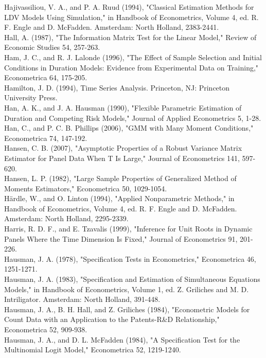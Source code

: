 \documentclass[10pt]{article}
\begin{document}
Hajivassiliou, V. A., and P. A. Ruud (1994), "Classical Estimation Methods for LDV Models Using Simulation," in Handbook of Econometrics, Volume 4, ed. R. F. Engle and D. McFadden. Amsterdam: North Holland, 2383-2441.\\
Hall, A. (1987), "The Information Matrix Test for the Linear Model," Review of Economic Studies 54, 257-263.\\
Ham, J. C., and R. J. Lalonde (1996), "The Effect of Sample Selection and Initial Conditions in Duration Models: Evidence from Experimental Data on Training," Econometrica 64, 175-205.\\
Hamilton, J. D. (1994), Time Series Analysis. Princeton, NJ: Princeton University Press.\\
Han, A. K., and J. A. Hausman (1990), "Flexible Parametric Estimation of Duration and Competing Risk Models," Journal of Applied Econometrics 5, 1-28.\\
Han, C., and P. C. B. Phillips (2006), "GMM with Many Moment Conditions," Econometrica 74, 147-192.\\
Hansen, C. B. (2007), "Asymptotic Properties of a Robust Variance Matrix Estimator for Panel Data When T Is Large," Journal of Econometrics 141, 597-620.\\
Hansen, L. P. (1982), "Large Sample Properties of Generalized Method of Moments Estimators," Econometrica 50, 1029-1054.\\
Härdle, W., and O. Linton (1994), "Applied Nonparametric Methods," in Handbook of Econometrics, Volume 4, ed. R. F. Engle and D. McFadden. Amsterdam: North Holland, 2295-2339.\\
Harris, R. D. F., and E. Tzavalis (1999), "Inference for Unit Roots in Dynamic Panels Where the Time Dimension Is Fixed," Journal of Econometrics 91, 201-226.\\
Hausman, J. A. (1978), "Specification Tests in Econometrics," Econometrica 46, 1251-1271.\\
Hausman, J. A. (1983), "Specification and Estimation of Simultaneous Equations Models," in Handbook of Econometrics, Volume 1, ed. Z. Griliches and M. D. Intriligator. Amsterdam: North Holland, 391-448.\\
Hausman, J. A., B. H. Hall, and Z. Griliches (1984), "Econometric Models for Count Data with an Application to the Patents-R\&D Relationship," Econometrica 52, 909-938.\\
Hausman, J. A., and D. L. McFadden (1984), "A Specification Test for the Multinomial Logit Model," Econometrica 52, 1219-1240.\\
\end{document}
